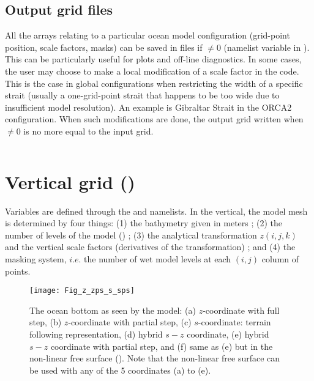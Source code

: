 \documentclass[../tex_main/NEMO_manual]{subfiles}
\begin{document}
\subsection{Output grid files}
\label{subsec:DOM_hgr_files}

All the arrays relating to a particular ocean model configuration (grid-point 
position, scale factors, masks) can be saved in files if  $\not= 0$ 
(namelist variable in ). This can be particularly useful for plots and off-line 
diagnostics. In some cases, the user may choose to make a local modification 
of a scale factor in the code. This is the case in global configurations when 
restricting the width of a specific strait (usually a one-grid-point strait that 
happens to be too wide due to insufficient model resolution). An example 
is Gibraltar Strait in the ORCA2 configuration. When such modifications are done, 
the output grid written when  $\not= 0$ is no more equal to the input grid.

$\ $\newline    %

\section{Vertical grid (\protect{})}
\label{sec:DOM_zgr}
%


Variables are defined through the  and  namelists.
In the vertical, the model mesh is determined by four things: 
(1) the bathymetry given in meters ; 
(2) the number of levels of the model () ; 
(3) the analytical transformation $z(i,j,k)$ and the vertical scale factors 
(derivatives of the transformation) ; 
and (4) the masking system, $i.e.$ the number of wet model levels at each 
$(i,j)$ column of points.

\begin{figure}[!tb]    \begin{center}
\texttt{[image: Fig\_z\_zps\_s\_sps]}
\caption{  \protect\label{fig:z_zps_s_sps}   
The ocean bottom as seen by the model: 
(a) $z$-coordinate with full step, 
(b) $z$-coordinate with partial step, 
(c) $s$-coordinate: terrain following representation, 
(d) hybrid $s-z$ coordinate, 
(e) hybrid $s-z$ coordinate with partial step, and 
(f) same as (e) but in the non-linear free surface (\protect{}). 
Note that the non-linear free surface can be used with any of the 
5 coordinates (a) to (e).}
\end{center}   \end{figure}
\end{document}
